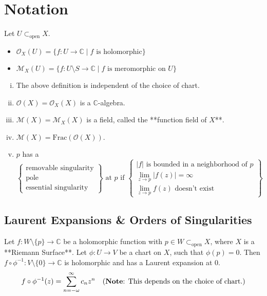 \documentclass{article}
\begin{document}
\section*{Notation}
Let $U \subset_{\text{open}} X$.
\begin{itemize}
    \item $\mathcal{O}_X(U) = \{f: U \to \mathbb{C} \mid f \text{ is holomorphic}\}$
    \item $\mathcal{M}_X(U) = \{f: U \setminus S \to \mathbb{C} \mid f \text{ is meromorphic on } U\}$
\end{itemize}

\begin{lemma}
\begin{enumerate}[i)]
    \item The above definition is independent of the choice of chart.
    \item $\mathcal{O}(X) = \mathcal{O}_X(X)$ is a $\mathbb{C}$-algebra.
    \item $\mathcal{M}(X) = \mathcal{M}_X(X)$ is a field, called the **function field of $X$**.
    \item $\mathcal{M}(X) = \text{Frac}(\mathcal{O}(X))$.
    \item $p$ has a
    $$
    \left\{
    \begin{array}{l}
    \text{removable singularity} \\
    \text{pole} \\
    \text{essential singularity}
    \end{array}
    \right\} \text{ at } p \text{ if }
    \left\{
    \begin{array}{l}
    |f| \text{ is bounded in a neighborhood of } p \\
    \lim_{z \to p} |f(z)| = \infty \\
    \lim_{z \to p} f(z) \text{ doesn't exist}
    \end{array}
    \right\}
    $$
\end{enumerate}
\end{lemma}

\subsection{Laurent Expansions \& Orders of Singularities}
Let $f: W \setminus \{p\} \to \mathbb{C}$ be a holomorphic function with $p \in W \subset_{\text{open}} X$, where $X$ is a **Riemann Surface**.
Let $\phi: U \to V$ be a chart on $X$, such that $\phi(p) = 0$.
Then $f \circ \phi^{-1}: V \setminus \{0\} \to \mathbb{C}$ is holomorphic and has a Laurent expansion at $0$.
$$
f \circ \phi^{-1}(z) = \sum_{n = -\omega}^{\infty} c_n z^n \quad \text{(\textbf{Note}: This depends on the choice of chart.)}
$$
\end{document}
